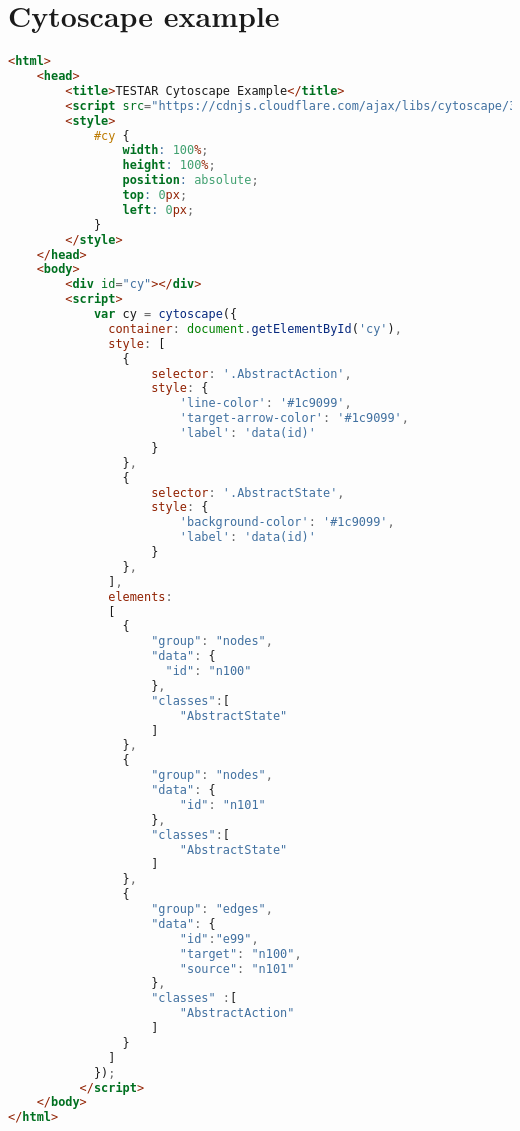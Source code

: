 \chapter{Cytoscape example}

\begin{lstlisting}[language=html, caption=Graph representation in JSON, label=code:cytoscape-example]
<html>
    <head>
        <title>TESTAR Cytoscape Example</title>
        <script src="https://cdnjs.cloudflare.com/ajax/libs/cytoscape/3.5.2/cytoscape.min.js"></script>
        <style>
            #cy {
                width: 100%;
                height: 100%;
                position: absolute;
                top: 0px;
                left: 0px;
            }
        </style>
    </head>
    <body>
        <div id="cy"></div>
        <script>
            var cy = cytoscape({
              container: document.getElementById('cy'),
              style: [
                {
                    selector: '.AbstractAction',
                    style: {
                        'line-color': '#1c9099',
                        'target-arrow-color': '#1c9099',
                        'label': 'data(id)'
                    }
                },
                {
                    selector: '.AbstractState',
                    style: {
                        'background-color': '#1c9099',
                        'label': 'data(id)'
                    }
                },
              ],
              elements: 
              [
                {
                    "group": "nodes",
                    "data": {
                      "id": "n100" 
                    },
                    "classes":[
                        "AbstractState"
                    ]
                },
                {
                    "group": "nodes",
                    "data": {
                        "id": "n101"
                    },
                    "classes":[
                        "AbstractState"
                    ]
                },
                {
                    "group": "edges",
                    "data": {
                        "id":"e99",
                        "target": "n100",
                        "source": "n101"
                    },
                    "classes" :[
                        "AbstractAction"
                    ]
                }
              ]
            });
          </script>
    </body>
</html>
\end{lstlisting}